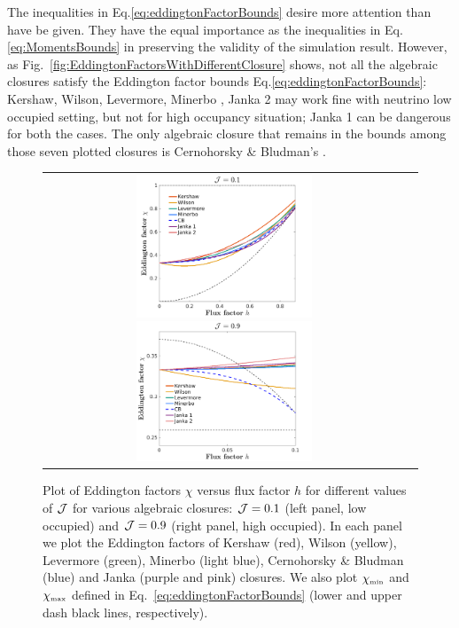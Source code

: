 The inequalities in Eq.\ref{eq:eddingtonFactorBounds} desire more attention than have be given.
They have the equal importance as the inequalities in Eq.\ref{eq:MomentsBounds} in preserving the validity of the simulation result.
However, as Fig.~\eqref{fig:EddingtonFactorsWithDifferentClosure} shows, not all the algebraic closures satisfy the Eddington factor bounds Eq.\ref{eq:eddingtonFactorBounds}: Kershaw\cite{kershaw_1976}, Wilson\cite{wilson_1975,leblanc_1970}, Levermore\cite{levermore_1984}, Minerbo \cite{minerbo_1978}, Janka 2\cite{janka_1992} may work fine with neutrino low occupied setting, but not for high occupancy situation; Janka 1\cite{janka_1991} can be dangerous for both the cases. The only algebraic closure that remains in the bounds among those seven plotted closures is Cernohorsky \& Bludman's \cite{cernohorskyBludman_1994}.
\begin{figure}[h]
  \centering
  \begin{tabular}{cc}
    \includegraphics[width=0.5\textwidth]{figures/Closures0_10}
    \includegraphics[width=0.5\textwidth]{figures/Closures0_90}
  \end{tabular}
   \caption{Plot of Eddington factors $\chi$ versus flux factor $h$ for different values of $\mathcal{J}$ for various algebraic closures: $\mathcal{J}=0.1$ (left panel, low occupied) and $\mathcal{J}=0.9$ (right panel, high occupied).  In each panel we plot the Eddington factors of Kershaw (red), Wilson (yellow), Levermore (green), Minerbo (light blue), Cernohorsky \& Bludman (blue) and Janka (purple and pink) closures.  We also plot $\chi_{\mbox{\tiny min}}$ and $\chi_{\mbox{\tiny max}}$ defined in Eq.~\eqref{eq:eddingtonFactorBounds} (lower and upper dash black lines, respectively).}
  \label{fig:EddingtonFactorsWithDifferentClosure}
\end{figure}

